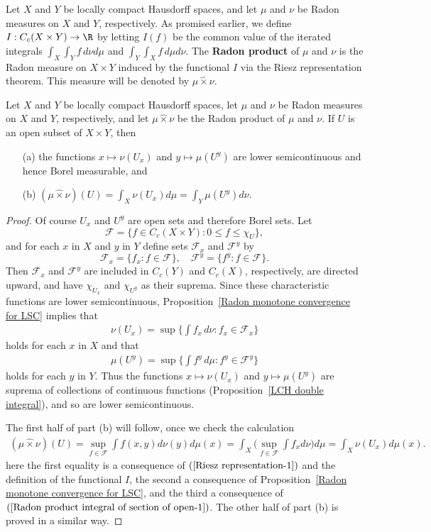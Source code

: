 Let $X$ and $Y$ be locally compact Hausdorff spaces, and let $\mu$ and $\nu$ be Radon measures on $X$ and $Y$, respectively. As promised earlier, we define $I:C_c(X\times Y)\to\R$ by letting $I(f)$ be the common value of the iterated integrals $\int_X\int_Yf\,d\nu d\mu$ and $\int_Y\int_Xf\,d\mu d\nu$. The \textbf{Radon product} of $\mu$ and $\nu$ is the Radon measure on $X\times Y$ induced by the functional $I$ via the Riesz representation theorem. This measure will be denoted by $\mu\hat{\times}\nu$.
\begin{proposition}\label{Radon product integral of section of open}
Let $X$ and $Y$ be locally compact Hausdorff spaces, let $\mu$ and $\nu$ be Radon measures on $X$ and $Y$, respectively, and let $\mu\hat{\times}\nu$ be the Radon product of $\mu$ and $\nu$. If $U$ is an open subset of $X\times Y$, then
\begin{itemize}
\item[(a)] the functions $x\mapsto\nu(U_x)$ and $y\mapsto\mu(U^y)$ are lower semicontinuous and hence Borel measurable, and
\item[(b)] $(\mu\hat{\times}\nu)(U)=\int_X\nu(U_x)d\mu=\int_Y\mu(U^y)d\nu$. 
\end{itemize}
\end{proposition}
\begin{proof}
Of course $U_x$ and $U^y$ are open sets and therefore Borel sets. Let
\[\mathscr{F}=\{f\in C_c(X\times Y):0\leq f\leq\chi_U\},\]
and for each $x$ in $X$ and $y$ in $Y$ define sets $\mathscr{F}_x$ and $\mathscr{F}^y$ by
\[\mathscr{F}_x=\{f_x:f\in\mathscr{F}\},\quad \mathscr{F}^y=\{f^y:f\in\mathscr{F}\}.\]
Then $\mathscr{F}_x$ and $\mathscr{F}^y$ are included in $C_c(Y)$ and $C_c(X)$, respectively, are directed upward, and have $\chi_{U_x}$ and $\chi_{U^y}$ as their suprema. Since these characteristic functions are lower semicontinuous, Proposition~\ref{Radon monotone convergence for LSC} implies that
\begin{align}\label{Radon product integral of section of open-1}
\nu(U_x)=\sup\{\int f_x\,d\nu:f_x\in\mathscr{F}_x\}
\end{align}
holds for each $x$ in $X$ and that
\begin{align}\label{Radon product integral of section of open-2}
\mu(U^y)=\sup\{\int f^y\,d\mu:f^y\in\mathscr{F}^y\}
\end{align}
holds for each $y$ in $Y$. Thus the functions $x\mapsto\nu(U_x)$ and $y\mapsto\mu(U^y)$ are suprema of collections of continuous functions (Proposition~\ref{LCH double integral}), and so are lower semicontinuous.\par
The first half of part (b) will follow, once we check the calculation
\begin{align*}
(\mu\hat{\times}\nu)(U)=\sup_{f\in\mathscr{F}}\int f(x,y)d\nu(y)d\mu(x)=\int_X\Big(\sup_{f\in\mathscr{F}}\int f_xd\nu\Big)d\mu=\int_X\nu(U_x)d\mu(x).
\end{align*}
here the first equality is a consequence of $(\ref{Riesz representation-1})$ and the definition of the functional $I$, the second a consequence of Proposition~\ref{Radon monotone convergence for LSC}, and the third a consequence of $(\ref{Radon product integral of section of open-1})$. The other half of part (b) is proved in a similar way.
\end{proof}

